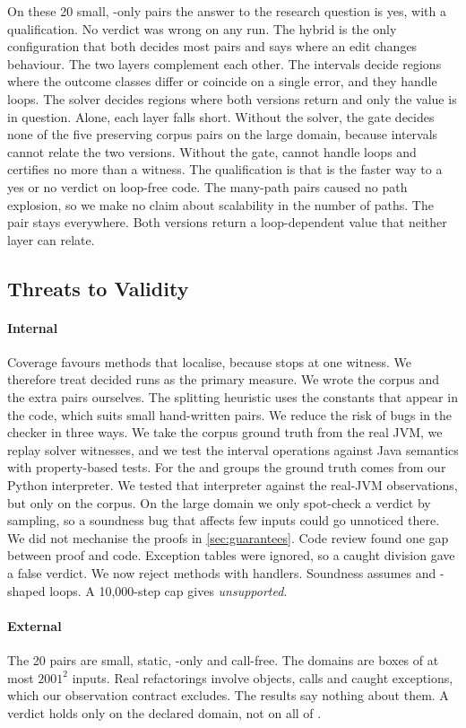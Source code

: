 On these 20 small, -only pairs the answer to the research question is yes, with a
qualification. No verdict was wrong on any run. The hybrid is the only configuration that
both decides most pairs and says where an edit changes behaviour. The two layers complement
each other. The intervals decide regions where the outcome classes differ or coincide on a
single error, and they handle loops. The solver decides regions where both versions return and
only the value is in question. Alone, each layer falls short. Without the solver, the gate
decides none of the five preserving corpus pairs on the large domain, because intervals cannot
relate the two versions. Without the gate,  cannot handle loops and certifies no
more than a witness. The qualification is that  is the faster way to a yes or no
verdict on loop-free code. The many-path pairs caused no path explosion, so we make no claim
about scalability in the number of paths. The pair  stays \unk{}
everywhere. Both versions return a loop-dependent value that neither layer can relate.

\subsection{Threats to Validity}
\label{sec:threats}

\paragraph{Internal}
Coverage favours methods that localise, because  stops at one witness. We
therefore treat decided runs as the primary measure. We wrote the corpus and the extra pairs
ourselves. The splitting heuristic uses the constants that appear in the code, which suits
small hand-written pairs. We reduce the risk of bugs in the checker in three ways. We take the
corpus ground truth from the real JVM, we replay solver witnesses, and we test the interval
operations against Java semantics with property-based tests. For the  and
 groups the ground truth comes from our Python interpreter. We tested that
interpreter against the real-JVM observations, but only on the corpus. On the large domain we
only spot-check a \pres{} verdict by sampling, so a soundness bug that affects few inputs could
go unnoticed there. We did not mechanise the proofs in \cref{sec:guarantees}. Code review found
one gap between proof and code. Exception tables were ignored, so a caught division gave a
false \chg{} verdict. We now reject methods with handlers. Soundness assumes  and
-shaped loops. A 10,000-step cap gives \emph{unsupported}.

\paragraph{External}
The 20 pairs are small, static, -only and call-free. The domains are boxes of at
most $2001^2$ inputs. Real refactorings involve objects, calls and caught exceptions, which our
observation contract excludes. The results say nothing about them. A verdict holds only on the
declared domain, not on all of .
